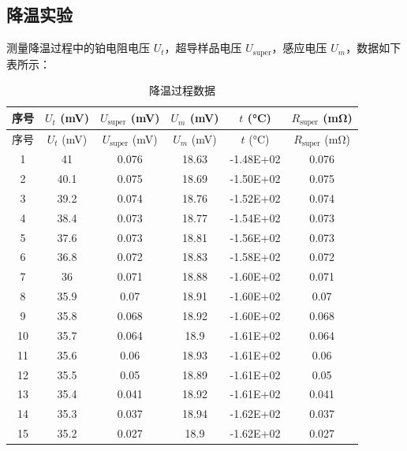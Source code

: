 \documentclass{THUexprep}
\begin{document}
\subsection{降温实验}

测量降温过程中的铂电阻电压 $U_t$，超导样品电压 $U_\text{super}$，感应电压 $U_m$，数据如下表所示：

\begin{longtable}{|c|c|c|c|c|c|}
    \caption{降温过程数据} \\
    \hline
    序号 & $U_t$ (\si{\milli\volt}) & $U_{\text{super}}$ (\si{\milli\volt})  & $U_m$ (\si{\milli\volt}) & $t$ (\si{\celsius})    & $R_\text{super}$ (\si{\milli\ohm}) \\
    \hline
    \endfirsthead
    \hline
    序号 & $U_t$ (\si{\milli\volt}) & $U_{\text{super}}$ (\si{\milli\volt})  & $U_m$ (\si{\milli\volt}) & $t$ (\si{\celsius})    & $R_\text{super}$ (\si{\milli\ohm}) \\
    \hline
    \endhead
    1     & 41    & 0.076 & 18.63 & -1.48E+02 & 0.076 \\
    \hline
    2     & 40.1  & 0.075 & 18.69 & -1.50E+02 & 0.075 \\
    \hline
    3     & 39.2  & 0.074 & 18.76 & -1.52E+02 & 0.074 \\
    \hline
    4     & 38.4  & 0.073 & 18.77 & -1.54E+02 & 0.073 \\
    \hline
    5     & 37.6  & 0.073 & 18.81 & -1.56E+02 & 0.073 \\
    \hline
    6     & 36.8  & 0.072 & 18.83 & -1.58E+02 & 0.072 \\
    \hline
    7     & 36    & 0.071 & 18.88 & -1.60E+02 & 0.071 \\
    \hline
    8     & 35.9  & 0.07  & 18.91 & -1.60E+02 & 0.07 \\
    \hline
    9     & 35.8  & 0.068 & 18.92 & -1.60E+02 & 0.068 \\
    \hline
    10    & 35.7  & 0.064 & 18.9  & -1.61E+02 & 0.064 \\
    \hline
    11    & 35.6  & 0.06  & 18.93 & -1.61E+02 & 0.06 \\
    \hline
    12    & 35.5  & 0.05  & 18.89 & -1.61E+02 & 0.05 \\
    \hline
    13    & 35.4  & 0.041 & 18.92 & -1.61E+02 & 0.041 \\
    \hline
    14    & 35.3  & 0.037 & 18.94 & -1.62E+02 & 0.037 \\
    \hline
    15    & 35.2  & 0.027 & 18.9  & -1.62E+02 & 0.027 \\

\end{longtable}
\end{document}
